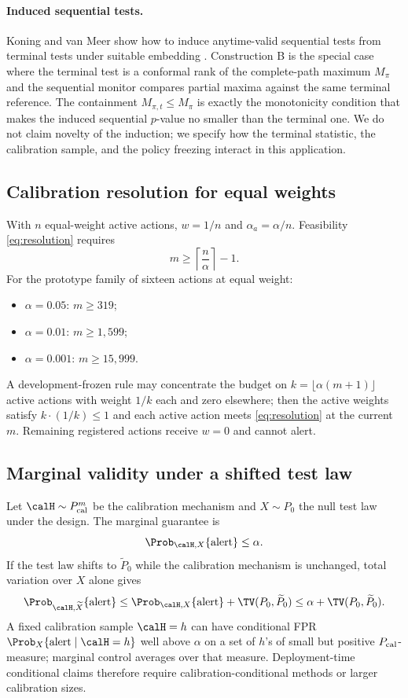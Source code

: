 \paragraph*{Induced sequential tests.}
Koning and van Meer show how to induce anytime-valid sequential tests from terminal tests under suitable embedding \citep{koning2026anytime}. Construction B is the special case where the terminal test is a conformal rank of the complete-path maximum \(M_\pi\) and the sequential monitor compares partial maxima against the same terminal reference. The containment \(M_{\pi,t}\leq M_\pi\) is exactly the monotonicity condition that makes the induced sequential \(p\)-value no smaller than the terminal one. We do not claim novelty of the induction; we specify how the terminal statistic, the calibration sample, and the policy freezing interact in this application.

\subsection{Calibration resolution for equal weights}\label{app:resolution}

With \(n\) equal-weight active actions, \(w=1/n\) and \(\alpha_a=\alpha/n\). Feasibility \eqref{eq:resolution} requires
\[
 m\geq \left\lceil\frac{n}{\alpha}\right\rceil-1.
\]
For the prototype family of sixteen actions at equal weight:
\begin{itemize}
\item \(\alpha=0.05\): \(m\geq 319\);
\item \(\alpha=0.01\): \(m\geq 1{,}599\);
\item \(\alpha=0.001\): \(m\geq 15{,}999\).
\end{itemize}
A development-frozen rule may concentrate the budget on \(k=\lfloor\alpha(m+1)\rfloor\) active actions with weight \(1/k\) each and zero elsewhere; then the active weights satisfy \(k\cdot(1/k)\leq1\) and each active action meets \eqref{eq:resolution} at the current \(m\). Remaining registered actions receive \(w=0\) and cannot alert.

\subsection{Marginal validity under a shifted test law}\label{app:shift}

Let \(\calH\sim P_{\rm cal}^{m}\) be the calibration mechanism and \(X\sim P_0\) the null test law under the design. The marginal guarantee is
\[
 \Prob_{\calH,X}\{\text{alert}\}\leq\alpha.
\]
If the test law shifts to \(\widetilde P_0\) while the calibration mechanism is unchanged, total variation over \(X\) alone gives
\[
 \Prob_{\calH,\widetilde X}\{\text{alert}\}
 \leq \Prob_{\calH,X}\{\text{alert}\}+\TV(P_0,\widetilde P_0)
 \leq \alpha+\TV(P_0,\widetilde P_0).
\]
A fixed calibration sample \(\calH=h\) can have conditional FPR
\(\Prob_X\{\text{alert}\mid \calH=h\}\) well above \(\alpha\) on a set of \(h\)'s of small but positive \(P_{\rm cal}\)-measure; marginal control averages over that measure. Deployment-time conditional claims therefore require calibration-conditional methods \citep{bates2023} or larger calibration sizes.
